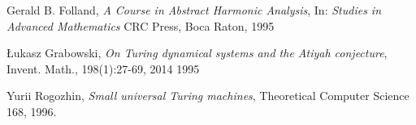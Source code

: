\begin{thebibliography}{1}
	
	Gerald B. Folland,
	\emph{A Course in Abstract Harmonic Analysis},
	In: \emph{Studies in Advanced Mathematics}
	CRC Press,
	Boca Raton,
	1995

	\L{}ukasz Grabowski,
	\emph{On Turing dynamical systems and the Atiyah conjecture},
	Invent. Math., 198(1):27-69,
	2014
	1995
	
	Yurii Rogozhin,
	\emph{Small universal Turing machines},
	Theoretical Computer Science 168,
	1996.

\end{thebibliography}
